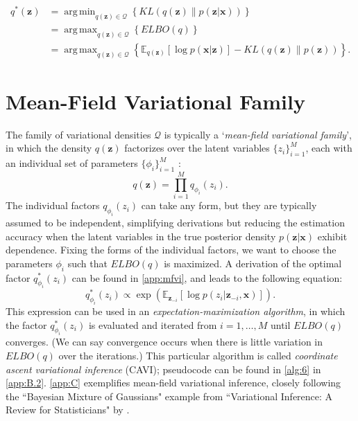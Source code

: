 \documentclass[honours,12pt, twoside]{unswthesis}
\DeclareMathOperator*{\argmin}{arg\,min}
\DeclareMathOperator*{\argmax}{arg\,max}
\numberwithin{equation}{section}
\theoremstyle{definition}
\begin{document}
\begin{align}
q^*(\bm{z})&=\argmin_{q(\bm{z})\in \mathcal{Q}}\left\lbrace KL(q(\bm{z})\|p(\bm{z}|\bm{x}))\right\rbrace\nonumber\\
&= \argmax_{q(\bm{z})\in \mathcal{Q}} \left\lbrace ELBO(q)\right\rbrace\nonumber\\
&= \argmax_{q(\bm{z})\in \mathcal{Q}} \left\lbrace\mathbb{E}_{q(\bm{z})}[\log p(\bm{x}|\bm{z})]-KL(q(\bm{z})\|p(\bm{z}))\right\rbrace.\nonumber
\end{align}
\section{Mean-Field Variational Family}\label{sec:3.5}
The family of variational densities $\mathcal{Q}$ is typically a `\textit{mean-field variational family}', in which the density $q(\bm{z})$ factorizes over the latent variables $\{z_i\}^M_{i=1}$, each with an individual set of parameters $\{\phi_i\}^M_{i=1}$ \citep{blei}:
\begin{equation*}
q(\bm{z})=\prod^M_{i=1}q_{\phi_i}(z_i).
\end{equation*}
The individual factors $q_{\phi_i}(z_i)$ can take any form, but they are typically assumed to be independent, simplifying derivations but reducing the estimation accuracy when the latent variables in the true posterior density $p(\bm{z}|\bm{x})$ exhibit dependence. Fixing the forms of the individual factors, we want to choose the parameters $\phi_i$ such that $ELBO(q)$ is maximized. A derivation of the optimal factor $q_{\phi_i}^*(z_i)$ can be found in \autoref{app:mfvi}, and leads to the following equation:
\[q^*_{\phi_i}(z_i)\propto \exp\left(\mathbb{E}_{\bm{z}_{-i}}[\log p(z_i|\bm{z}_{-i},\bm{x})]\right).\]
This expression can be used in an \textit{expectation-maximization algorithm}, in which the factor $q^*_{\phi_i}(z_i)$ is evaluated and iterated from $i=1,\dots, M$ until $ELBO(q)$ converges. (We can say convergence occurs when there is little variation in $ELBO(q)$ over the iterations.) This particular algorithm is called \textit{coordinate ascent variational inference} (CAVI); pseudocode can be found in \autoref{alg:6} in \autoref{app:B.2}. \autoref{app:C} exemplifies mean-field variational inference, closely following the ``Bayesian Mixture of Gaussians" example from ``Variational Inference: A Review for Statisticians" by \citet{blei}.
\end{document}
